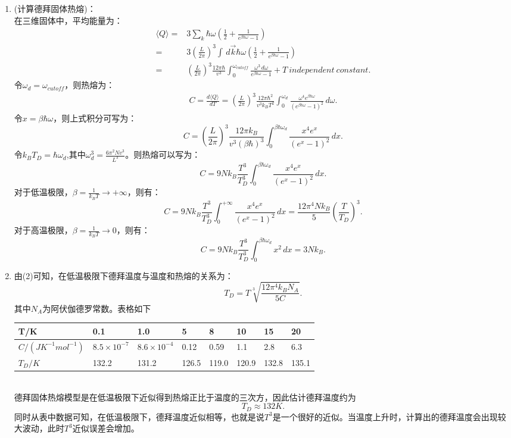 \documentclass[reqno,a4paper,12pt]{amsart}
\begin{document}
\begin{enumerate}
	\item (计算德拜固体热熔)： \\
	在三维固体中，平均能量为：
	\begin{equation*}
	\begin{aligned}
		\langle Q \rangle =& 3\sum_{k} \hbar\omega\left( \frac{1}{2} + \frac{1}{e^{\beta\hbar\omega} - 1} \right) \\
		=& 3\left( \frac{L}{2\pi} \right)^3 \int \,d\vec{k} \hbar\omega \left( \frac{1}{2} + \frac{1}{e^{\beta\hbar\omega} - 1} \right) \\
		=& \left( \frac{L}{2\pi} \right)^3 \frac{12\pi\hbar}{v^3} \int_{0}^{\omega_{cutoff}} \frac{\omega^3 \,d\omega}{e^{\beta\hbar\omega} - 1} + T ~ independent ~ constant.
	\end{aligned}
	\end{equation*}
	令$\omega_d = \omega_{cutoff}$，则热熔为：
	\begin{equation*}
	\begin{aligned}
		C = \frac{d\langle Q \rangle}{dT} = \left( \frac{L}{2\pi} \right)^3 \frac{12\pi\hbar^2}{v^3k_BT^2}\int_0^{\omega_d}\frac{\omega^4 e^{\beta\hbar\omega}}{(e^{\beta\hbar\omega}-1)^2}\,d\omega.
	\end{aligned}
	\end{equation*}
	令$x = \beta\hbar\omega$，则上式积分可写为：
	\[
		C = \left( \frac{L}{2\pi} \right)^3 \frac{12\pi k_B}{v^3(\beta\hbar)^3} \int_0^{\beta\hbar\omega_d} \frac{x^4e^x}{(e^x-1)^2}\,dx.
	\]
	令$k_BT_D = \hbar\omega_d$,其中$\omega_d^3 = \frac{6\pi^2Nv^3}{L^3}$。则热熔可以写为：
	\[
		C = 9Nk_B \frac{T^3}{T_D^3} \int_0^{\beta\hbar\omega_d} \frac{x^4e^x}{(e^x-1)^2}\,dx.
	\]
	对于低温极限，$\beta = \frac{1}{k_BT} \to +\infty$，则有：
	\[
		C = 9Nk_B \frac{T^3}{T_D^3}\int_0^{+\infty} \frac{x^4e^x}{(e^x-1)^2}\,dx = \frac{12\pi^4Nk_B}{5}\left(\frac{T}{T_D}\right)^3.
	\]
	对于高温极限，$\beta = \frac{1}{k_BT} \to 0$，则有：
	\[
		C = 9Nk_B \frac{T^3}{T_D^3} \int_0^{\beta\hbar\omega_d}x^2\,dx = 3Nk_B.
	\]
	
	\item
	由(2)可知，在低温极限下德拜温度与温度和热熔的关系为：
	\[
		T_D = T \sqrt[3]{\frac{12\pi^4k_BN_A}{5C}}.
	\]
	其中$N_A$为阿伏伽德罗常数。表格如下
	\begin{table}[h]
	\begin{tabular}{|l|l|l|l|l|l|l|l|}
	\hline
		T/K & 0.1 & 1.0 & 5 & 8 & 10 & 15 & 20 \\ \hline
		$C/(J K^{-1}mol^{-1})$ & $8.5\times 10^{-7}$ & $8.6\times 10^{-4}$ & 0.12 & 0.59 & 1.1 & 2.8 & 6.3 \\ \hline
		$T_D/K$ & 132.2 & 131.2 & 126.5 & 119.0 & 120.9 & 132.8 & 135.1 \\ \hline
	\end{tabular}
	\end{table} \\
	德拜固体热熔模型是在低温极限下近似得到热熔正比于温度的三次方，因此估计德拜温度约为
	\[
		T_D \approx 132K.
	\]
	同时从表中数据可知，在低温极限下，德拜温度近似相等，也就是说$T^3$是一个很好的近似。当温度上升时，计算出的德拜温度会出现较大波动，此时$T^3$近似误差会增加。
\end{enumerate}
\end{document}
